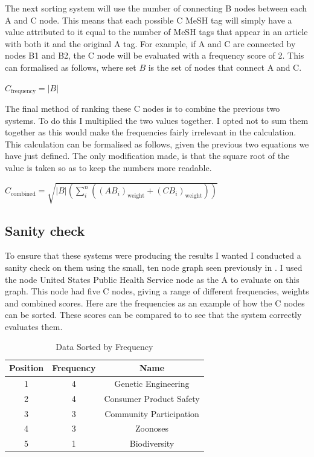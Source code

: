 \documentclass{l4proj}
\begin{document}
The next sorting system will use the number of connecting B nodes between each A and C node. This means that each possible C MeSH tag will simply have a value attributed to it equal to the number of MeSH tags that appear in an article with both it and the original A tag. For example, if A and C are connected by nodes B1 and B2, the C node will be evaluated with a frequency score of 2. This can formalised as follows, where set $B$ is the set of nodes that connect A and C.
\begin{center}
    $C_{\text{frequency}} = |B| $\\
\end{center}

The final method of ranking these C nodes is to combine the previous two systems. To do this I multiplied the two values together. I opted not to sum them together as this would make the frequencies fairly irrelevant in the calculation. This calculation can be formalised as follows, given the previous two equations we have just defined. The only modification made, is that the square root of the value is taken so as to keep the numbers more readable.
\begin{center}
    $C_{\text{combined}} = \sqrt{|B|(\sum_i^n ((AB_i)_{\text{weight}} + (CB_i)_{\text{weight}}))}$\\
\end{center}

\subsection{Sanity check}

To ensure that these systems were producing the results I wanted I conducted a sanity check on them using the small, ten node graph seen previously in . I used the node United States Public Health Service node as the A to evaluate on this graph. This node had five C nodes, giving a range of different frequencies, weights and combined scores. Here are the frequencies as an example of how the C nodes can be sorted. These scores can be compared to  to see that the system correctly evaluates them.\\

\begin{table}[h]
\centering
\caption{Data Sorted by Frequency}
\begin{tabular}{|c|c|c|}
\hline
\textbf{Position} & \textbf{Frequency} & \textbf{Name} \\ \hline
1 & 4 & Genetic Engineering \\ \hline
2 & 4 & Consumer Product Safety \\ \hline
3 & 3 & Community Participation \\ \hline
4 & 3 & Zoonoses \\ \hline
5 & 1 & Biodiversity \\ \hline
\end{tabular}
\end{table}
\end{document}
